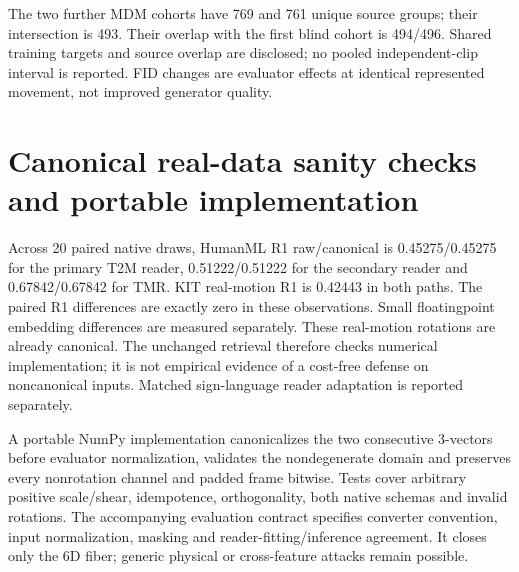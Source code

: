 The two further MDM cohorts have 769 and 761 unique source groups; their intersection is 493. Their overlap with the first blind cohort is 494/496. Shared training targets and source overlap are disclosed; no pooled independent-clip interval is reported. FID changes are evaluator effects at identical represented movement, not improved generator quality.

\section{Canonical real-data sanity checks and portable implementation}

Across 20 paired native draws, HumanML R1 raw/canonical is 0.45275/0.45275 for the primary T2M reader, 0.51222/0.51222 for the secondary reader and 0.67842/0.67842 for TMR. KIT real-motion R1 is 0.42443 in both paths. The paired R1 differences are exactly zero in these observations. Small floatingpoint embedding differences are measured separately. These real-motion rotations are already canonical. The unchanged retrieval therefore checks numerical implementation; it is not empirical evidence of a cost-free defense on noncanonical inputs. Matched sign-language reader adaptation is reported separately.

A portable NumPy implementation canonicalizes the two consecutive 3-vectors before evaluator normalization, validates the nondegenerate domain and preserves every nonrotation channel and padded frame bitwise. Tests cover arbitrary positive scale/shear, idempotence, orthogonality, both native schemas and invalid rotations. The accompanying evaluation contract specifies converter convention, input normalization, masking and reader-fitting/inference agreement. It closes only the 6D fiber; generic physical or cross-feature attacks remain possible.
